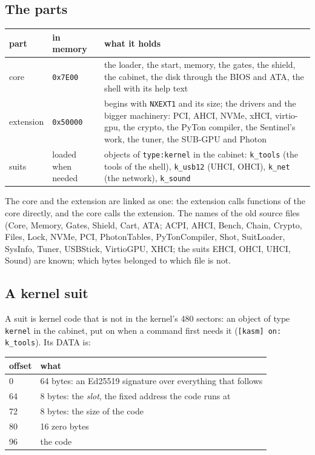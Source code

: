 \documentclass[11pt,a4paper]{article}
\begin{document}
\subsection{The parts}

\begin{longtable}{@{}l l p{8.5cm}@{}}
\toprule
part & in memory & what it holds \\ \midrule
core & \texttt{0x7E00} & the loader, the start, memory, the gates, the shield, the cabinet, the
                         disk through the BIOS and ATA, the shell with its help text \\
extension & \texttt{0x50000} & begins with \texttt{NXEXT1} and its size; the drivers and the
                         bigger machinery: PCI, AHCI, NVMe, xHCI, virtio-gpu, the crypto, the
                         PyTon compiler, the Sentinel's work, the tuner, the SUB-GPU and Photon \\
suits & loaded when needed & objects of \texttt{type:kernel} in the cabinet: \texttt{k\_tools}
                         (the tools of the shell), \texttt{k\_usb12} (UHCI, OHCI),
                         \texttt{k\_net} (the network), \texttt{k\_sound} \\
\bottomrule
\end{longtable}

\noindent The core and the extension are linked as one: the extension calls functions of the core
directly, and the core calls the extension. The names of the old source files (Core, Memory, Gates,
Shield, Cart, ATA; ACPI, AHCI, Bench, Chain, Crypto, Files, Lock, NVMe, PCI, PhotonTables,
PyTonCompiler, Shot, SuitLoader, SysInfo, Tuner, USBStick, VirtioGPU, XHCI; the suits EHCI, OHCI,
UHCI, Sound) are known; which bytes belonged to which file is not.

\subsection{A kernel suit}

A suit is kernel code that is not in the kernel's 480 sectors: an object of type \texttt{kernel}
in the cabinet, put on when a command first needs it (\texttt{[kasm] on: k\_tools}). Its DATA is:

\begin{longtable}{@{}l p{12cm}@{}}
\toprule
offset & what \\ \midrule
0 & 64 bytes: an Ed25519 signature over everything that follows \\
64 & 8 bytes: the \emph{slot}, the fixed address the code runs at \\
72 & 8 bytes: the size of the code \\
80 & 16 zero bytes \\
96 & the code \\
\bottomrule
\end{longtable}
\end{document}
